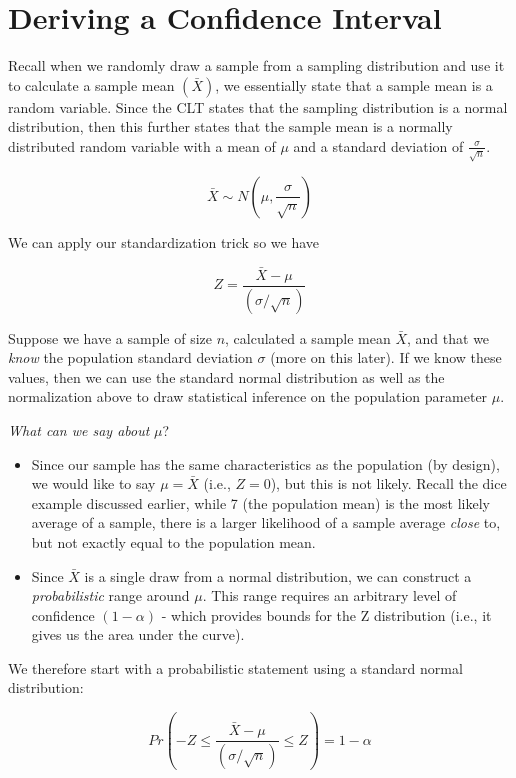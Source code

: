 \documentclass[
]{book}
\begin{document}
\section{Deriving a Confidence Interval}\label{deriving-a-confidence-interval}

Recall when we randomly draw a sample from a sampling distribution and use it to calculate a sample mean \((\bar{X})\), we essentially state that a sample mean is a random variable. Since the CLT states that the sampling distribution is a normal distribution, then this further states that the sample mean is a normally distributed random variable with a mean of \(\mu\) and a standard deviation of \(\frac{\sigma}{\sqrt{n}}\).

\[\bar{X} \sim N\left(\mu,\frac{\sigma}{\sqrt{n}}\right)\]

We can apply our standardization trick so we have

\[Z=\frac{\bar{X}-\mu}{(\sigma/\sqrt{n})}\]

Suppose we have a sample of size \(n\), calculated a sample mean \(\bar{X}\), and that we \emph{know} the population standard deviation \(\sigma\) (more on this later). If we know these values, then we can use the standard normal distribution as well as the normalization above to draw statistical inference on the population parameter \(\mu\).

\emph{What can we say about} \(\mu\)?

\begin{itemize}
\item
  Since our sample has the same characteristics as the population (by design), we would like to say \(\mu = \bar{X}\) (i.e., \(Z=0\)), but this is not likely. Recall the dice example discussed earlier, while 7 (the population mean) is the most likely average of a sample, there is a larger likelihood of a sample average \emph{close} to, but not exactly equal to the population mean.
\item
  Since \(\bar{X}\) is a single draw from a normal distribution, we can construct a \emph{probabilistic} range around \(\mu\). This range requires an arbitrary level of confidence \((1-\alpha)\) - which provides bounds for the Z distribution (i.e., it gives us the area under the curve).
\end{itemize}

We therefore start with a probabilistic statement using a standard normal distribution:

\[Pr\left(-Z \leq \frac{\bar{X}-\mu}{(\sigma/\sqrt{n})} \leq Z\right)=1-\alpha\]
\end{document}
